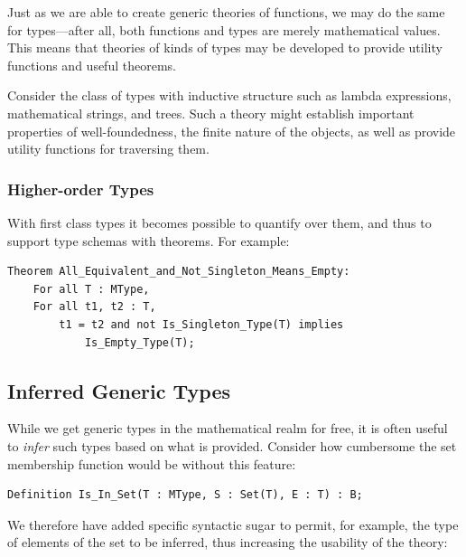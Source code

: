 Just as we are able to create generic theories of functions, we may do the same for types---after all, both functions and types are merely mathematical values.  This means that theories of kinds of types may be developed to provide utility functions and useful theorems.

Consider the class of types with inductive structure such as lambda expressions, mathematical strings, and trees.  Such a theory might establish important properties of well-foundedness, the finite nature of the objects, as well as provide utility functions for traversing them.

		\subsubsection{Higher-order Types\label{higherOrderTypes}}

With first class types it becomes possible to quantify over them, and thus to support type schemas with theorems.  For example:

\begin{lstlisting}
Theorem All_Equivalent_and_Not_Singleton_Means_Empty:
	For all T : MType,
	For all t1, t2 : T,
		t1 = t2 and not Is_Singleton_Type(T) implies
			Is_Empty_Type(T);
\end{lstlisting}

	\subsection{Inferred Generic Types\label{inferredGenericTypes}}

While we get generic types in the mathematical realm for free, it is often useful to \emph{infer} such types based on what is provided.  Consider how cumbersome the set membership function would be without this feature:

\begin{lstlisting}
Definition Is_In_Set(T : MType, S : Set(T), E : T) : B;
\end{lstlisting}

We therefore have added specific syntactic sugar to permit, for example, the type of elements of the set to be inferred, thus increasing the usability of the theory:

